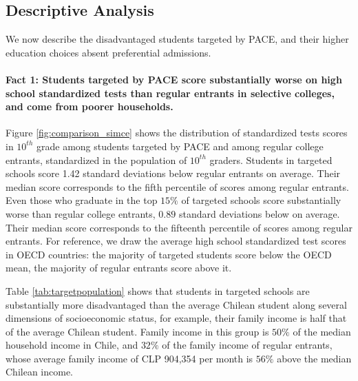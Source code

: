 



\subsection{Descriptive Analysis}\label{sec:descriptives}
We now describe the disadvantaged students targeted by PACE, and their higher education choices absent preferential admissions.\par





\paragraph{Fact 1: Students targeted by PACE score substantially worse on high school standardized tests than regular entrants in selective colleges, and come from poorer households.} Figure \ref{fig:comparison_simce} shows the distribution of standardized tests scores in $10^{th}$ grade among students targeted by PACE and among regular college entrants, standardized in the population of $10^{th}$ graders. Students in targeted schools score 1.42 standard deviations below regular entrants on average. Their median score corresponds to the fifth percentile of scores among regular entrants. Even those who graduate in the top $15\%$ of targeted schools score substantially worse than regular college entrants, $0.89$ standard deviations below on average. Their median score corresponds to the fifteenth percentile of scores among regular entrants. For reference, we draw the average high school standardized test scores in OECD countries: the majority of targeted students score below the OECD mean, the majority of regular entrants score above it.\par 

Table \ref{tab:targetpopulation} shows that students in targeted schools are substantially more disadvantaged than the average Chilean student along several dimensions of socioeconomic status, for example, their family income is half that of the average Chilean student. Family income in this group is $50\%$ of the median household income in Chile, and $32\%$ of the family income of regular entrants, whose average family income of CLP 904,354 per month is $56\%$ above the median Chilean income.










